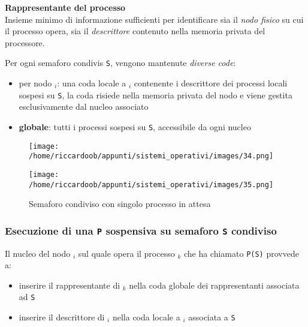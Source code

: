 \begin{mdframed}[topline=false,bottomline=false,rightline=false]
\textbf{Rappresentante del processo}\\
Insieme minimo di informazione sufficienti per identificare sia il \textit{nodo fisico} su cui il processo opera, sia il \textit{descrittore} contenuto nella memoria privata del processore.
\end{mdframed}

Per ogni semaforo condivis \texttt{S}, vengono mantenute \textit{diverse code}:
\begin{itemize}
    \item per nodo $_i$: una coda locale a $_i$ contenente i descrittore dei processi locali sospesi su \texttt{S}, la coda risiede nella memoria privata del nodo e viene gestita esclusivamente dal nucleo associato
    \item \textbf{globale}: tutti i processi sospesi su \texttt{S}, accessibile da ogni nucleo
\end{itemize}

\begin{figure}[H]
    \centering
    \texttt{[image: /home/riccardoob/appunti/sistemi\_operativi/images/34.png]}
\end{figure}

\begin{figure}[H]
    \caption{Semaforo condiviso con singolo processo in attesa}
    \centering
    \texttt{[image: /home/riccardoob/appunti/sistemi\_operativi/images/35.png]}
\end{figure}

\subsubsection{Esecuzione di una \texttt{P} sospensiva su semaforo \texttt{S} condiviso}

Il nucleo del nodo $_i$ sul quale opera il processo $_k$ che ha chiamato \texttt{P(S)} provvede a:
\begin{itemize}
    \item inserire il rappresentante di $_k$ nella coda globale dei rappresentanti associata ad \texttt{S}
    \item inserire il descrittore di $_i$ nella coda locale a $_i$ associata a \texttt{S}
\end{itemize}

